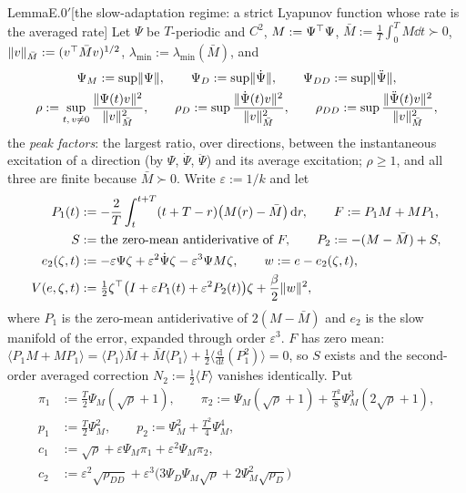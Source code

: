 \begin{thm}{Lemma}{E.0$'$}[the slow-adaptation regime: a strict Lyapunov function whose rate is the averaged rate]
Let $\Psi$ be $T$-periodic and $C^2$, $M:=\Psi^\top\Psi$, $\bar M:=\frac1T\int_0^TM\dd t\succ0$,
$\lVert v\rVert_{\bar M}:=(v^\top\bar Mv)^{1/2}$, $\lambda_{\min}:=\lambda_{\min}(\bar M)$, and
\begin{gather*}
  \Psi_M:=\sup\lVert \Psi\rVert,\qquad \Psi_D:=\sup\lVert \dot\Psi\rVert,\qquad \Psi_{DD}:=\sup\lVert \ddot\Psi\rVert,\\
  \rho:=\sup_{t,\,v\neq0}\frac{\lVert \Psi(t)v\rVert^2}{\lVert v\rVert^2_{\bar M}},\qquad
  \rho_D:=\sup\frac{\lVert \dot\Psi(t)v\rVert^2}{\lVert v\rVert^2_{\bar M}},\qquad
  \rho_{DD}:=\sup\frac{\lVert \ddot\Psi(t)v\rVert^2}{\lVert v\rVert^2_{\bar M}},
\end{gather*}
the \emph{peak factors}: the largest ratio, over directions, between the instantaneous excitation of a direction (by
$\Psi$, $\dot\Psi$, $\ddot\Psi$) and its average excitation; $\rho\ge1$, and all three are finite because
$\bar M\succ0$. Write $\varepsilon:=1/k$ and let
\begin{align*}
  P_1(t)&:=-\frac2T\int_t^{t+T}(t+T-r)\bigl(M(r)-\bar M\bigr)\,\mathrm{d} r,\qquad F:=P_1M+MP_1,\\
  S&:=\text{the zero-mean antiderivative of }F,\qquad P_2:=-(M-\bar M)+S,\\
  e_2(\zeta,t)&:=-\varepsilon\Psi\zeta+\varepsilon^2\dot\Psi\zeta-\varepsilon^3\Psi M\zeta,\qquad w:=e-e_2(\zeta,t),\\
  V(e,\zeta,t)&:=\tfrac12\zeta^\top\bigl(I+\varepsilon P_1(t)+\varepsilon^2P_2(t)\bigr)\zeta+\frac\beta2\lVert w\rVert^2,
\end{align*}
where $P_1$ is the zero-mean antiderivative of $2(M-\bar M)$ and $e_2$ is the slow manifold of the error, expanded
through order $\varepsilon^3$. $F$ has zero mean: $\langle P_1M+MP_1\rangle=\langle P_1\rangle\bar M+\bar M\langle P_1\rangle
+\frac12\bigl\langle\frac{\mathrm{d}}{\mathrm{d}t}(P_1^2)\bigr\rangle=0$, so $S$ exists and the second-order averaged
correction $N_2:=\frac12\langle F\rangle$ vanishes identically. Put
\begin{align*}
  \pi_1&:=\tfrac T2\Psi_M(\sqrt\rho+1),\qquad
  \pi_2:=\Psi_M(\sqrt\rho+1)+\tfrac{T^2}8\Psi_M^3(2\sqrt\rho+1),\\
  p_1&:=\tfrac T2\Psi_M^2,\qquad p_2:=\Psi_M^2+\tfrac{T^2}4\Psi_M^4,\\
  c_1&:=\sqrt\rho+\varepsilon\Psi_M\pi_1+\varepsilon^2\Psi_M\pi_2,\\
  c_2&:=\varepsilon^2\sqrt{\rho_{DD}}+\varepsilon^3\bigl(3\Psi_D\Psi_M\sqrt\rho+2\Psi_M^2\sqrt{\rho_D}\bigr)

\end{align*}
\end{thm}
